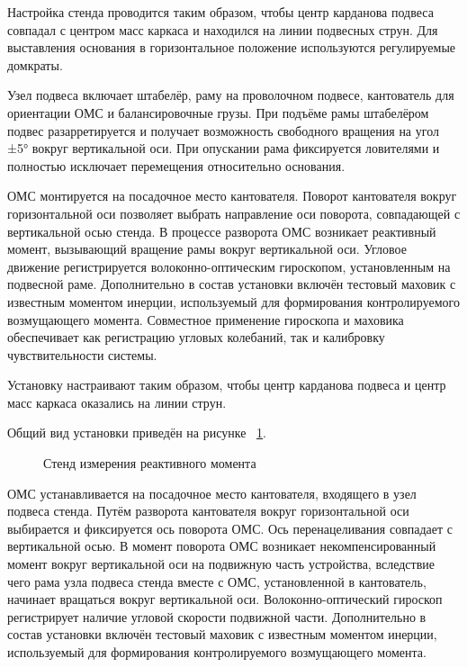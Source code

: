 Настройка стенда проводится таким образом, чтобы центр карданова подвеса совпадал с центром масс каркаса и находился на линии подвесных струн. Для выставления основания в горизонтальное положение используются регулируемые домкраты.

Узел подвеса включает штабелёр, раму на проволочном подвесе, кантователь для ориентации ОМС и балансировочные грузы. При подъёме рамы штабелёром подвес разарретируется и получает возможность свободного вращения на угол ±5° вокруг вертикальной оси. При опускании рама фиксируется ловителями и полностью исключает перемещения относительно основания.

ОМС монтируется на посадочное место кантователя. Поворот кантователя вокруг горизонтальной оси позволяет выбрать направление оси поворота, совпадающей с вертикальной осью стенда. В процессе разворота ОМС возникает реактивный момент, вызывающий вращение рамы вокруг вертикальной оси. Угловое движение регистрируется волоконно-оптическим гироскопом, установленным на подвесной раме. Дополнительно в состав установки включён тестовый маховик с известным моментом инерции, используемый для формирования контролируемого возмущающего момента. Совместное применение гироскопа и маховика обеспечивает как регистрацию угловых колебаний, так и калибровку чувствительности системы.

Установку настраивают таким образом, чтобы центр карданова подвеса и центр масс каркаса оказались на линии струн.

Общий вид установки приведён на рисунке ~\cref{fig:yoiom}.
 
\begin{figure}[!h] 
	\caption{Стенд измерения реактивного момента}
	\label{fig:yoiom} 
\end{figure}

ОМС устанавливается на посадочное место кантователя, входящего в  узел подвеса стенда. Путём разворота кантователя вокруг горизонтальной оси выбирается и фиксируется ось поворота ОМС. Ось перенацеливания совпадает с вертикальной осью. 
В момент поворота ОМС возникает некомпенсированный момент вокруг вертикальной оси на подвижную часть устройства, вследствие чего рама узла подвеса стенда вместе с ОМС, установленной в кантователь, начинает вращаться вокруг вертикальной оси. Волоконно-оптический гироскоп регистрирует наличие угловой скорости подвижной части. Дополнительно в состав установки включён тестовый маховик с известным моментом инерции, используемый для формирования контролируемого возмущающего момента.

